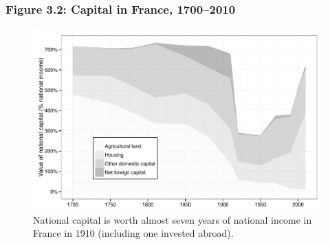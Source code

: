 \documentclass[t]{beamer}\usepackage[]{graphicx}\usepackage[]{color}
\newenvironment{knitrout}{}{} %
\begin{document}
\begin{frame}[label=Figure_3_2]
\frametitle{Figure 3.2: Capital in France, 1700--2010}
\begin{figure}[t]
\begin{minipage}[b]{\textwidth}
\centering
\begin{knitrout}\footnotesize
{}\color{fgcolor}

{\centering \includegraphics[width=1\linewidth]{figures/bw/Figure_3_2} 

}



\end{knitrout}
\caption{National capital is worth almost seven years of national income in France in 1910 (including one invested abroad).}
\end{minipage}
\end{figure}
\end{frame}
\end{document}
